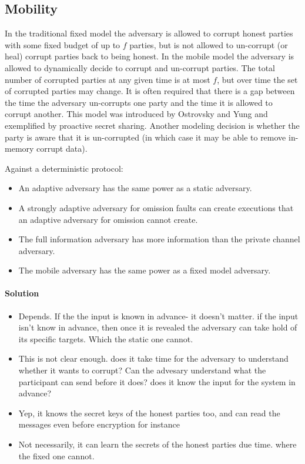 \subsection{Mobility}
In the traditional fixed model the adversary is allowed to corrupt honest parties with 
some fixed budget of up to $f$ parties, but is not allowed to un-corrupt (or heal) 
corrupt parties back to being honest. 
In the mobile model the adversary is allowed to dynamically decide to 
corrupt and un-corrupt parties. 
The total number of corrupted parties at any given time is at most $f$, 
but over time the set of corrupted parties may change. 
It is often required that there is a gap between the time the adversary un-corrupts one party and 
the time it is allowed to corrupt another. 
This model was introduced by Ostrovsky and Yung and exemplified by proactive secret sharing. 
Another modeling decision is whether the party is aware that it is un-corrupted (in which case it may 
be able to remove in-memory corrupt data).




\begin{xca}[Quiz 1.G]
    Against a deterministic protocol:
    \begin{itemize} 
        \item An adaptive adversary has the same power as a static adversary.
        \item A strongly adaptive adversary for omission faults can create executions 
        that an adaptive adversary for omission cannot create.
        \item The full information adversary has more information than the private channel adversary.
        \item The mobile adversary has the same power as a fixed model adversary.
\end{itemize}
    
\paragraph{Solution}
\begin{itemize}
    \item Depends. If the the input is known in advance- it doesn't matter.
    if the input isn't know in advance, then once it is revealed the adversary can take hold of its specific targets.
    Which the static one cannot.

    \item This is not clear enough. does it take time for the adversary to understand whether it wants to corrupt? 
    Can the advesary understand what the participant can send before it does? does it know the input for the system 
    in advance?
    \item Yep, it knows the secret keys of the honest parties too, and can read the messages even before encryption for instance
    \item Not necessarily, it can learn the secrets of the honest parties due time. where the fixed one cannot.
\end{itemize}
\end{xca}



